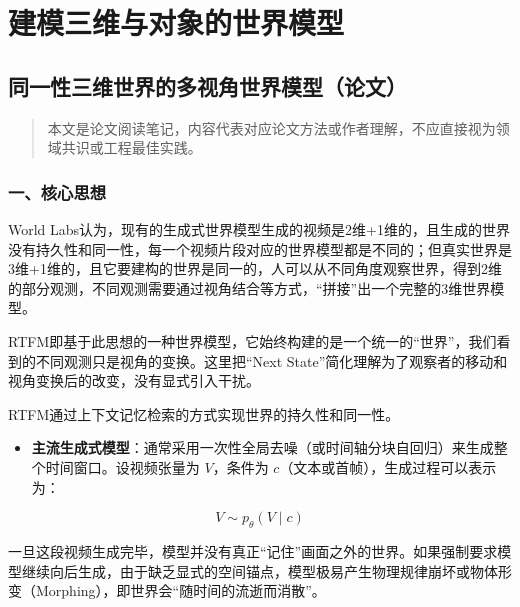 \hypertarget{ux5efaux6a21ux4e09ux7ef4ux4e0eux5bf9ux8c61ux7684ux4e16ux754cux6a21ux578b}{%
\chapter{建模三维与对象的世界模型}\label{ux5efaux6a21ux4e09ux7ef4ux4e0eux5bf9ux8c61ux7684ux4e16ux754cux6a21ux578b}}

\hypertarget{ux540cux4e00ux6027ux4e09ux7ef4ux4e16ux754cux7684ux591aux89c6ux89d2ux4e16ux754cux6a21ux578bux8bbaux6587}{%
\section{同一性三维世界的多视角世界模型（论文）}\label{ux540cux4e00ux6027ux4e09ux7ef4ux4e16ux754cux7684ux591aux89c6ux89d2ux4e16ux754cux6a21ux578bux8bbaux6587}}

\begin{quote}
本文是论文阅读笔记，内容代表对应论文方法或作者理解，不应直接视为领域共识或工程最佳实践。
\end{quote}

\hypertarget{ux4e00ux6838ux5fc3ux601dux60f3-22}{%
\subsection{一、核心思想}\label{ux4e00ux6838ux5fc3ux601dux60f3-22}}

World Labs认为，现有的生成式世界模型生成的视频是2维+1维的，且生成的世界没有持久性和同一性，每一个视频片段对应的世界模型都是不同的；但真实世界是3维+1维的，且它要建构的世界是同一的，人可以从不同角度观察世界，得到2维的部分观测，不同观测需要通过视角结合等方式，``拼接''出一个完整的3维世界模型。

RTFM即基于此思想的一种世界模型，它始终构建的是一个统一的``世界''，我们看到的不同观测只是视角的变换。这里把``Next State''简化理解为了观察者的移动和视角变换后的改变，没有显式引入干扰。

RTFM通过上下文记忆检索的方式实现世界的持久性和同一性。

\begin{itemize}
\tightlist
\item
  \textbf{主流生成式模型}：通常采用一次性全局去噪（或时间轴分块自回归）来生成整个时间窗口。设视频张量为 \(V\)，条件为 \(c\)（文本或首帧），生成过程可以表示为：
\end{itemize}

\[
V \sim p_\theta(V \mid c)
\]

一旦这段视频生成完毕，模型并没有真正``记住''画面之外的世界。如果强制要求模型继续向后生成，由于缺乏显式的空间锚点，模型极易产生物理规律崩坏或物体形变（Morphing），即世界会``随时间的流逝而消散''。

